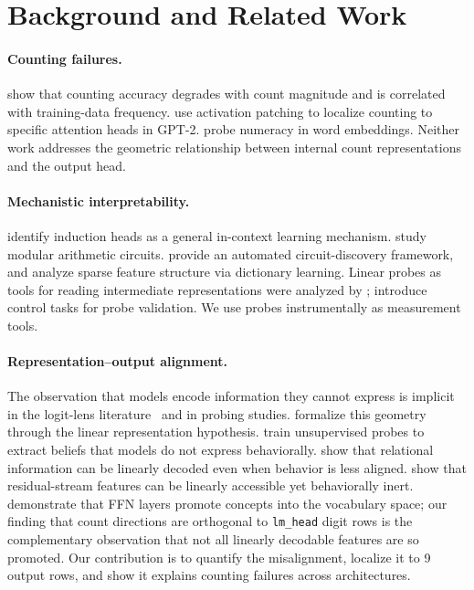 \documentclass{article}
\begin{document}
\section{Background and Related Work}
\label{sec:background}

\paragraph{Counting failures.}
\citet{razeghi2022impact} show that counting accuracy degrades with count magnitude and
is correlated with training-data frequency.
\citet{stolfo2023mechanistic} use activation patching to localize counting to specific
attention heads in GPT-2.
\citet{wallace2019nlp} probe numeracy in word embeddings.
Neither work addresses the geometric relationship between internal count representations and the output head.

\paragraph{Mechanistic interpretability.}
\citet{olsson2022context} identify induction heads as a general in-context learning mechanism.
\citet{nanda2023progress} study modular arithmetic circuits.
\citet{conmy2023acdc} provide an automated circuit-discovery framework,
and \citet{bricken2023monosemanticity} analyze sparse feature structure via dictionary learning.
Linear probes as tools for reading intermediate representations were analyzed by
\citet{alain2016understanding}; \citet{hewitt2019designing} introduce control tasks for probe validation. We use probes instrumentally as measurement tools.

\paragraph{Representation--output alignment.}
The observation that models encode information they cannot express is implicit in the
logit-lens literature~\citep{nostalgebraist2020logitlens,belrose2023eliciting} and in probing studies.
\citet{park2023linear} formalize this geometry through the linear representation hypothesis.
\citet{burns2023discovering} train unsupervised probes to extract beliefs that models do not express behaviorally.
\citet{hernandez2024linearity} show that relational information can be linearly decoded even when behavior is less aligned.
\citet{din2023jump} show that residual-stream features can be linearly accessible yet behaviorally inert.
\citet{geva2021transformer,geva2022transformer} demonstrate that FFN layers promote concepts into the vocabulary space; our finding that count directions are orthogonal to \texttt{lm\_head} digit rows is the complementary observation that not all linearly decodable features are so promoted.
Our contribution is to quantify the misalignment, localize it to 9 output rows, and show it explains counting failures across architectures.
\end{document}

